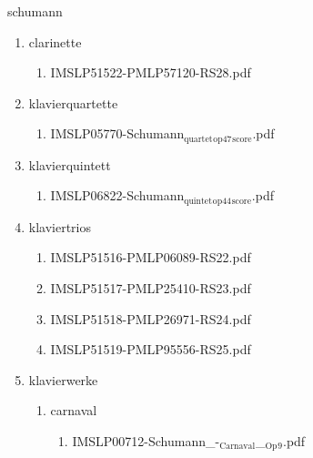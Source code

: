 \documentclass[11pt]{article}
\begin{document}
\item schumann
\label{sec-1-1-1-1-44-61}
\begin{enumerate}
\item clarinette
\label{sec-1-1-1-1-44-61-1}
\begin{enumerate}
\item IMSLP51522-PMLP57120-RS28.pdf
\label{sec-1-1-1-1-44-61-1-1}
\end{enumerate}

\item klavierquartette
\label{sec-1-1-1-1-44-61-2}
\begin{enumerate}
\item IMSLP05770-Schumann$_{\text{quartet}}$$_{\text{op47}}$$_{\text{score}}$.pdf
\label{sec-1-1-1-1-44-61-2-1}
\end{enumerate}

\item klavierquintett
\label{sec-1-1-1-1-44-61-3}
\begin{enumerate}
\item IMSLP06822-Schumann$_{\text{quintet}}$$_{\text{op44}}$$_{\text{score}}$.pdf
\label{sec-1-1-1-1-44-61-3-1}
\end{enumerate}

\item klaviertrios
\label{sec-1-1-1-1-44-61-4}
\begin{enumerate}
\item IMSLP51516-PMLP06089-RS22.pdf
\label{sec-1-1-1-1-44-61-4-1}

\item IMSLP51517-PMLP25410-RS23.pdf
\label{sec-1-1-1-1-44-61-4-2}

\item IMSLP51518-PMLP26971-RS24.pdf
\label{sec-1-1-1-1-44-61-4-3}

\item IMSLP51519-PMLP95556-RS25.pdf
\label{sec-1-1-1-1-44-61-4-4}
\end{enumerate}

\item klavierwerke
\label{sec-1-1-1-1-44-61-5}
\begin{enumerate}
\item carnaval
\label{sec-1-1-1-1-44-61-5-1}
\begin{enumerate}
\item IMSLP00712-Schumann\_-$_{\text{Carnaval}}$\_$_{\text{Op}}$$_{\text{9}}$.pdf
\label{sec-1-1-1-1-44-61-5-1-1}
\end{enumerate}


\end{enumerate}
\end{enumerate}
\end{document}
